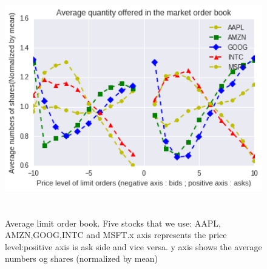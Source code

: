 \begin{figure}[hbtp]
	\begin{center}
		\includegraphics[width=5in,height=4in]{figures/level_quantity.png}
	\end{center}
	\caption{Average limit order book. Five stocks that we use: AAPL, AMZN,GOOG,INTC and MSFT.x axis represents the price level:positive axis is ask side and vice versa. y axis shows the average numbers og shares (normalized by mean)} \label{fig:level_quantity}
\end{figure}